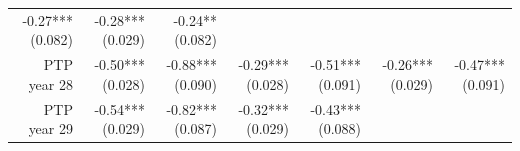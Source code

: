 \documentclass[]{article}
\begin{document}
\begin{longtable}[c]{@{}rrrrrrr@{}}
\begin{minipage}[t]{0.12\columnwidth}
-0.27*** (0.082)
\strut\end{minipage} &
\begin{minipage}[t]{0.11\columnwidth}\raggedleft\strut
-0.28*** (0.029)
\strut\end{minipage} &
\begin{minipage}[t]{0.11\columnwidth}\raggedleft\strut
-0.24** (0.082)
\strut\end{minipage}\tabularnewline
\begin{minipage}[t]{0.12\columnwidth}\raggedleft\strut
PTP year 28
\strut\end{minipage} &
\begin{minipage}[t]{0.11\columnwidth}\raggedleft\strut
-0.50*** (0.028)
\strut\end{minipage} &
\begin{minipage}[t]{0.12\columnwidth}\raggedleft\strut
-0.88*** (0.090)
\strut\end{minipage} &
\begin{minipage}[t]{0.11\columnwidth}\raggedleft\strut
-0.29*** (0.028)
\strut\end{minipage} &
\begin{minipage}[t]{0.12\columnwidth}\raggedleft\strut
-0.51*** (0.091)
\strut\end{minipage} &
\begin{minipage}[t]{0.11\columnwidth}\raggedleft\strut
-0.26*** (0.029)
\strut\end{minipage} &
\begin{minipage}[t]{0.11\columnwidth}\raggedleft\strut
-0.47*** (0.091)
\strut\end{minipage}\tabularnewline
\begin{minipage}[t]{0.12\columnwidth}\raggedleft\strut
PTP year 29
\strut\end{minipage} &
\begin{minipage}[t]{0.11\columnwidth}\raggedleft\strut
-0.54*** (0.029)
\strut\end{minipage} &
\begin{minipage}[t]{0.12\columnwidth}\raggedleft\strut
-0.82*** (0.087)
\strut\end{minipage} &
\begin{minipage}[t]{0.11\columnwidth}\raggedleft\strut
-0.32*** (0.029)
\strut\end{minipage} &
\begin{minipage}[t]{0.12\columnwidth}\raggedleft\strut
-0.43*** (0.088)
\strut\end{minipage} &
\begin{minipage}[t]{0.11\columnwidth}\raggedleft\strut

\end{minipage}
\end{longtable}
\end{document}
